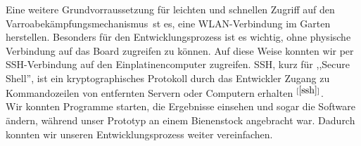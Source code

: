 \documentclass[11pt,a4paper]{article}
\newcommand{\bibRef}[1]{\hyperlink{#1}{$^{[\ref*{#1}{}]}$}}
\newcommand{\productName}{Varroabekämpfungsmechanismus}
\begin{document}
Eine weitere Grundvorraussetzung für leichten und schnellen Zugriff auf den \productName \ st es, eine WLAN-Verbindung im Garten herstellen. Besonders für den Entwicklungsprozess ist es wichtig, ohne physische Verbindung auf das Board zugreifen zu können. Auf diese Weise konnten wir per SSH-Verbindung auf den Einplatinencomputer zugreifen. SSH, kurz für ,,Secure Shell'', ist ein kryptographisches Protokoll durch das Entwickler Zugang zu Kommandozeilen von entfernten Servern oder Computern erhalten \bibRef{ssh}.\\
Wir konnten Programme starten, die Ergebnisse einsehen und sogar die Software ändern, während unser Prototyp an einem Bienenstock angebracht war. Dadurch konnten wir unseren Entwicklungsprozess weiter vereinfachen.
\end{document}

